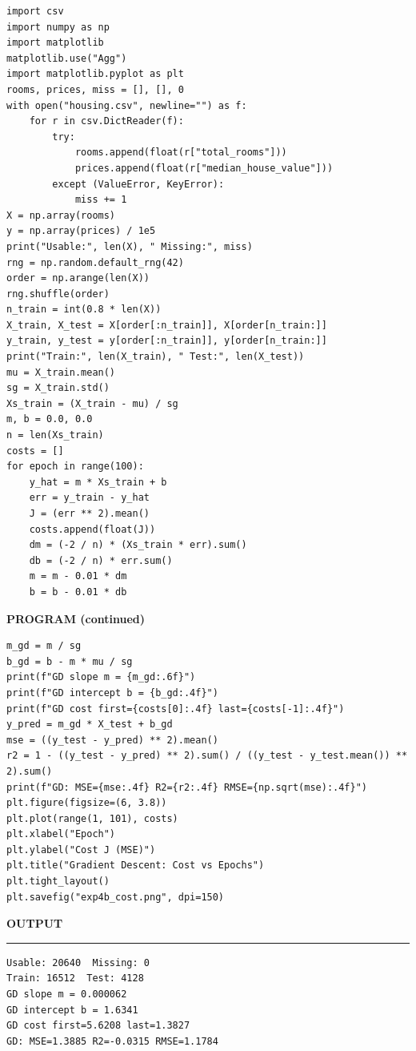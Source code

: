 \documentclass[11pt,twoside]{article}
\newcommand{\expheading}[1]{{\fontsize{14}{17}\selectfont\textbf{#1}\par}}
\newcommand{\toevenpage}{\clearpage\ifodd\value{page}\null\thispagestyle{empty}\newpage\fi}
\begin{document}
\begin{lstlisting}
import csv
import numpy as np
import matplotlib
matplotlib.use("Agg")
import matplotlib.pyplot as plt
rooms, prices, miss = [], [], 0
with open("housing.csv", newline="") as f:
    for r in csv.DictReader(f):
        try:
            rooms.append(float(r["total_rooms"]))
            prices.append(float(r["median_house_value"]))
        except (ValueError, KeyError):
            miss += 1
X = np.array(rooms)
y = np.array(prices) / 1e5
print("Usable:", len(X), " Missing:", miss)
rng = np.random.default_rng(42)
order = np.arange(len(X))
rng.shuffle(order)
n_train = int(0.8 * len(X))
X_train, X_test = X[order[:n_train]], X[order[n_train:]]
y_train, y_test = y[order[:n_train]], y[order[n_train:]]
print("Train:", len(X_train), " Test:", len(X_test))
mu = X_train.mean()
sg = X_train.std()
Xs_train = (X_train - mu) / sg
m, b = 0.0, 0.0
n = len(Xs_train)
costs = []
for epoch in range(100):
    y_hat = m * Xs_train + b
    err = y_train - y_hat
    J = (err ** 2).mean()
    costs.append(float(J))
    dm = (-2 / n) * (Xs_train * err).sum()
    db = (-2 / n) * err.sum()
    m = m - 0.01 * dm
    b = b - 0.01 * db
\end{lstlisting}

\toevenpage
\expheading{PROGRAM (continued)}
\vspace{6pt}

\begin{lstlisting}
m_gd = m / sg
b_gd = b - m * mu / sg
print(f"GD slope m = {m_gd:.6f}")
print(f"GD intercept b = {b_gd:.4f}")
print(f"GD cost first={costs[0]:.4f} last={costs[-1]:.4f}")
y_pred = m_gd * X_test + b_gd
mse = ((y_test - y_pred) ** 2).mean()
r2 = 1 - ((y_test - y_pred) ** 2).sum() / ((y_test - y_test.mean()) ** 2).sum()
print(f"GD: MSE={mse:.4f} R2={r2:.4f} RMSE={np.sqrt(mse):.4f}")
plt.figure(figsize=(6, 3.8))
plt.plot(range(1, 101), costs)
plt.xlabel("Epoch")
plt.ylabel("Cost J (MSE)")
plt.title("Gradient Descent: Cost vs Epochs")
plt.tight_layout()
plt.savefig("exp4b_cost.png", dpi=150)
\end{lstlisting}
\toevenpage
\expheading{OUTPUT}
\vspace{2pt}
\noindent\rule{\textwidth}{0.5pt}\par
\vspace{4pt}
\begin{verbatim}
Usable: 20640  Missing: 0
Train: 16512  Test: 4128
GD slope m = 0.000062
GD intercept b = 1.6341
GD cost first=5.6208 last=1.3827
GD: MSE=1.3885 R2=-0.0315 RMSE=1.1784
\end{verbatim}
\vspace{4pt}
\end{document}
